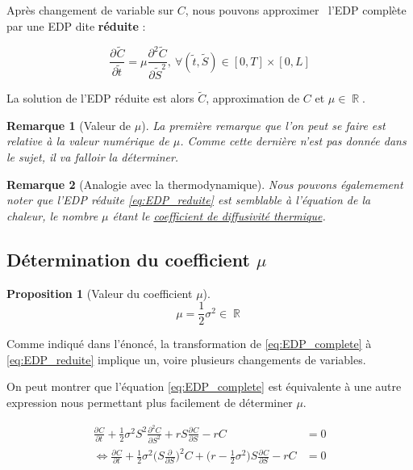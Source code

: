 \documentclass[11pt,a4paper]{article}
\newcommand{\deriv}[3][]{%
  \ensuremath{\frac{\partial^{#1} {#2}}{\partial {#3}^{#1}}}}
\theoremstyle{plain}
\newtheorem{rmq}{Remarque}
\newtheorem{prop}{Proposition}
\DeclareMathOperator{\R}{\mathbb{R}}
\begin{document}
Après changement de variable sur $C$, nous pouvons \og approximer \fg \ l'EDP complète par une EDP dite \textbf{réduite} :

\begin{equation}
\label{eq:EDP_reduite}
    \deriv{\widetilde{C}}{\widetilde{t}} = \mu \deriv[2]{\widetilde{C}}{\widetilde{S}}, \ \forall (\widetilde{t}, \widetilde{S}) \in \left[0, T\right]\times\left[0, L\right]
\end{equation}

La solution de l'EDP réduite est alors $\widetilde{C}$, approximation de $C$ et $\mu \in \R$.


\begin{rmq}[Valeur de $\mu$] La première remarque que l'on peut se faire est relative à la valeur numérique de $\mu$. Comme cette dernière n'est pas donnée dans le sujet, il va falloir la déterminer.
\end{rmq}

\begin{rmq}[Analogie avec la thermodynamique]
Nous pouvons égalemement noter que l'EDP réduite \eqref{eq:EDP_reduite} est semblable à l'équation de la chaleur, le nombre $\mu$ étant le \underline{coefficient de diffusivité thermique}.
\end{rmq}


\subsection{Détermination du coefficient $\mu$}

\begin{prop}[Valeur du coefficient $\mu$] $$\boxed{\mu = \frac{1}{2}\sigma^2} \in \R$$
\end{prop}

Comme indiqué dans l'énoncé, la transformation de \eqref{eq:EDP_complete} à \eqref{eq:EDP_reduite} implique un, voire plusieurs changements de variables.


On peut montrer que l'équation \eqref{eq:EDP_complete} est équivalente à une autre expression nous permettant plus facilement de déterminer $\mu$.

\begin{align}
    \deriv{C}{t} + \frac{1}{2}\sigma^2 S^2 \deriv[2]{C}{S} + rS\deriv{C}{S} - rC &= 0 \tag{1} \\
    \Longleftrightarrow \deriv{C}{t} + \frac{1}{2}\sigma^2\Big(S\deriv{}{S}\Big)^2C + \Big(r - \frac{1}{2}\sigma^2\Big)S\deriv{C}{S} - rC &= 0 \label{3}
\end{align}
\end{document}
